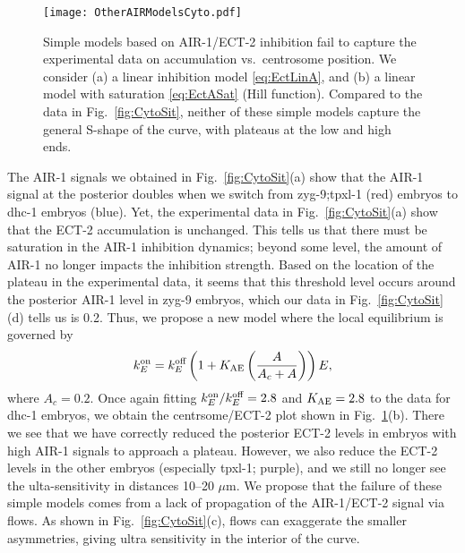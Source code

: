 \documentclass[11pt]{article}
\begin{document}
\begin{appendix}
\begin{figure}
\centering
\texttt{[image: OtherAIRModelsCyto.pdf]}
\caption{\label{fig:LinFail}Simple models based on AIR-1/ECT-2 inhibition fail to capture the experimental data on accumulation vs.\ centrosome position. We consider (a) a linear inhibition model \eqref{eq:EctLinA}, and (b) a linear model with saturation \eqref{eq:EctASat} (Hill function). Compared to the data in Fig.\ \ref{fig:CytoSit}, neither of these simple models capture the general S-shape of the curve, with plateaus at the low and high ends. }
\end{figure}

The AIR-1 signals we obtained in Fig.\ \ref{fig:CytoSit}(a) show that the AIR-1 signal at the posterior doubles when we switch from zyg-9;tpxl-1 (red) embryos to dhc-1 embryos (blue). Yet, the experimental data in Fig.\ \ref{fig:CytoSit}(a) show that the ECT-2 accumulation is unchanged. This tells us that there must be saturation in the AIR-1 inhibition dynamics; beyond some level, the amount of AIR-1 no longer impacts the inhibition strength. Based on the location of the plateau in the experimental data, it seems that this threshold level occurs around the posterior AIR-1 level in zyg-9 embryos, which our data in Fig.\ \ref{fig:CytoSit}(d) tells us is 0.2. Thus, we propose a new model where the local equilibrium is governed by 
\begin{equation}
\label{eq:EctASat}
 k^\text{on}_E = k^\text{off}_E \left(1+K_\text{AE} \left(\frac{A}{A_c+A}\right) \right)E,
\end{equation}
where $A_c=0.2$. Once again fitting $k^\text{on}_E/k^\text{off}_E=2.8$ and $K_\text{AE}=2.8$ to the data for dhc-1 embryos, we obtain the centrsome/ECT-2 plot shown in Fig.\ \ref{fig:LinFail}(b). There we see that we have correctly reduced the posterior ECT-2 levels in embryos with high AIR-1 signals to approach a plateau. However, we also reduce the ECT-2 levels in the other embryos (especially tpxl-1; purple), and we still no longer see the ulta-sensitivity in distances 10--20 $\mu$m. We propose that the failure of these simple models comes from a lack of propagation of the AIR-1/ECT-2 signal via flows. As shown in Fig.\ \ref{fig:CytoSit}(c), flows can exaggerate the smaller asymmetries, giving ultra sensitivity in the interior of the curve.


\end{appendix}




\end{document}
